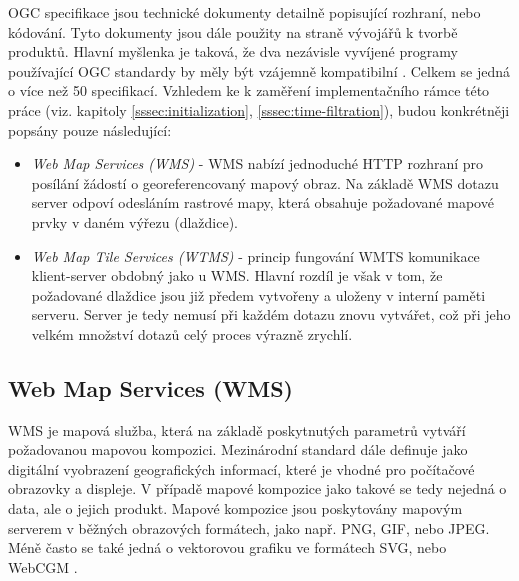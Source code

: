 OGC specifikace jsou technické dokumenty detailně popisující rozhraní,
nebo kódování. Tyto dokumenty jsou dále použity na straně vývojářů k
tvorbě produktů. Hlavní myšlenka je taková, že dva nezávisle
vyvíjené programy používající OGC standardy by měly být vzájemně
kompatibilní \cite{oqc_web}. Celkem se jedná o více než 50
specifikací. Vzhledem ke k zaměření implementačního rámce této práce (viz. kapitoly \ref{sssec:initialization}, \ref{sssec:time-filtration}), budou konkrétněji popsány pouze následující:

\newpage
\begin{itemize}
\item\textit{Web Map Services (WMS)} - WMS nabízí jednoduché HTTP
  rozhraní pro posílání žádostí o georeferencovaný mapový obraz. Na
  základě WMS dotazu server odpoví odesláním rastrové mapy, která
  obsahuje požadované mapové prvky v daném výřezu (dlaždice).
	 
\item\textit{Web Map Tile Services (WTMS)} - princip fungování WMTS
  komunikace klient-server obdobný jako u WMS. Hlavní rozdíl je však v
  tom, že požadované dlaždice jsou již předem vytvořeny a uloženy
  v interní paměti serveru. Server je tedy nemusí při každém dotazu
  znovu vytvářet, což při jeho velkém množství dotazů celý proces
  výrazně zrychlí.
\end{itemize}

\subsection{Web Map Services (WMS)}

WMS je mapová služba, která na základě poskytnutých
parametrů vytváří požadovanou mapovou kompozici. Mezinárodní standard dále
definuje  jako digitální vyobrazení geografických informací,
které je vhodné pro počítačové obrazovky a displeje. V případě mapové kompozice
jako takové se tedy nejedná o data, ale o jejich produkt. Mapové kompozice 
jsou poskytovány mapovým serverem v běžných obrazových formátech, jako
např. PNG, GIF, nebo JPEG. Méně často se také jedná o vektorovou
grafiku ve formátech SVG, nebo WebCGM \cite{oqc_wms}.

